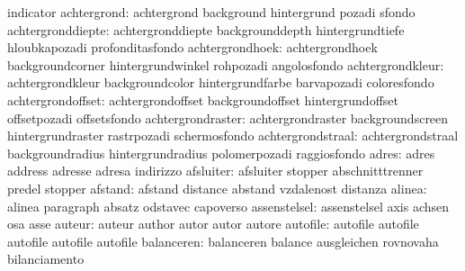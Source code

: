                            indicator                 %
              achtergrond: achtergrond               background
                           hintergrund               pozadi
                           sfondo
        achtergronddiepte: achtergronddiepte         backgrounddepth
                           hintergrundtiefe          hloubkapozadi
                           profonditasfondo
          achtergrondhoek: achtergrondhoek           backgroundcorner
                           hintergrundwinkel         rohpozadi
                           angolosfondo
         achtergrondkleur: achtergrondkleur          backgroundcolor
                           hintergrundfarbe          barvapozadi
                           coloresfondo
        achtergrondoffset: achtergrondoffset         backgroundoffset
                           hintergrundoffset         offsetpozadi
                           offsetsfondo
        achtergrondraster: achtergrondraster         backgroundscreen
                           hintergrundraster         rastrpozadi
                           schermosfondo
        achtergrondstraal: achtergrondstraal         backgroundradius
                           hintergrundradius         polomerpozadi
                           raggiosfondo
                    adres: adres                     address
                           adresse                   adresa
                           indirizzo
                afsluiter: afsluiter                 stopper
                           abschnitttrenner          predel
                           stopper
                  afstand: afstand                   distance
                           abstand                   vzdalenost
                           distanza
                   alinea: alinea                    paragraph
                           absatz                    odstavec
                           capoverso %
             assenstelsel: assenstelsel              axis
                           achsen                    osa
                           asse
                   auteur: auteur                    author
                           autor                     autor
                           autore
                 autofile: autofile                  autofile             
                           autofile                  autofile             
                           autofile                  %
               balanceren: balanceren                balance
                           ausgleichen               rovnovaha
                           bilanciamento
